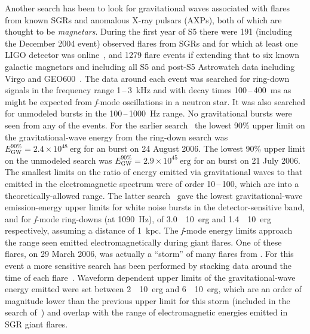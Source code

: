 \documentclass{article}
\begin{document}
Another search has been to look for gravitational waves associated with flares
from known SGRs and anomalous X-ray pulsars (AXPs), both of which are thought to
be \textit{magnetars}. During the first year of S5 there were 191 (including the
December 2004  event) observed flares from SGRs  and
 for which at least one LIGO detector was online~\cite{Abbott:2008h}, and
1279 flare events if extending that to six known galactic magnetars and
including all S5 and post-S5 Astrowatch data including Virgo and
GEO600~\cite{Abadie:2010c}. The data around each event was searched
for ring-down signals in the frequency range 1\,--\,3~kHz and with
decay times 100\,--\,400~ms as might be expected from \textit{f}-mode
oscillations in a neutron star. It was also searched for unmodeled
bursts in the 100\,--\,1000~Hz range. No gravitational bursts were
seen from any of the events. For the earlier
search~\cite{Abbott:2008h} the lowest 90\% upper limit on the
gravitational-wave energy from the ring-down search was $E_{\mathrm{GW}}^{90\%} =
2.4\times10^{48}\mathrm{\ erg}$ for an  burst on 24 August 2006. The
lowest 90\% upper limit on the unmodeled search was
$E_{\mathrm{GW}}^{90\%} = 2.9\times10^{45}\mathrm{\ erg}$ for an 
burst on 21 July 2006. The smallest limits on the ratio of energy
emitted via gravitational waves to that emitted in the electromagnetic
spectrum were of order 10\,--\,100, which are into a theoretically-allowed range. The latter search~\cite{Abadie:2010c} gave the lowest
gravitational-wave emission-energy upper limits for white noise bursts
in the detector-sensitive band, and for \textit{f}-mode ring-downs (at
1090~Hz), of 3.0~\texttimes~10~erg and
1.4~\texttimes~10~erg respectively, assuming a distance of
1~kpc. The \textit{f}-mode energy limits approach the range seen emitted
electromagnetically during giant flares. One of these flares, on 29
March 2006, was actually a ``storm'' of many flares from
. For this event a more sensitive search has been performed
by stacking data around the time of each
flare~\cite{Abbott:2009c}. Waveform dependent upper limits of the
gravitational-wave energy emitted were set between
2~\texttimes~10~erg and 6~\texttimes~10~erg, which
are an order of magnitude lower than the previous upper limit for this
storm (included in the search of~\cite{Abbott:2008h}) and overlap with
the range of electromagnetic energies emitted in SGR giant flares.
\end{document}
